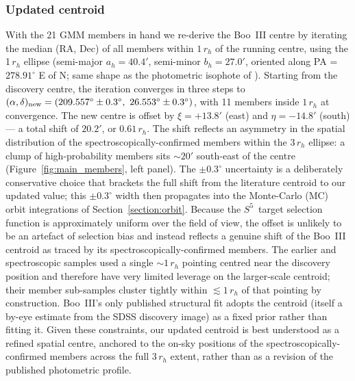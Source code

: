 \documentclass[twocolumn, apj, numberedappendix, appendixfloats]{openjournal_dhayaa}
\newcommand{\SSSSS}{${S}^5$\xspace}
\begin{document}
\subsubsection{Updated centroid}
With the 21 GMM members in hand we re-derive the Boo~III centre by iterating the median (RA, Dec) of all members within $1\,r_h$ of the running centre, using the 1\,$r_h$ ellipse (semi-major $a_h = 40.4'$, semi-minor $b_h = 27.0'$, oriented along PA = $278.91^\circ$ E of N; same shape as the photometric isophote of \citealt{Moskowitz2020}). Starting from the \citet{Grillmair2009} discovery centre, the iteration converges in three steps to $(\alpha, \delta)_{\rm new} = (209.557^\circ \pm 0.3^\circ,\ 26.553^\circ \pm 0.3^\circ)$, with 11 members inside $1\,r_h$ at convergence. The new centre is offset by $\xi = +13.8'$ (east) and $\eta = -14.8'$ (south) --- a total shift of $20.2'$, or $0.61\,r_h$. The shift reflects an asymmetry in the spatial distribution of the spectroscopically-confirmed members within the $3\,r_h$ ellipse: a clump of high-probability members sits $\sim 20'$ south-east of the \citet{Grillmair2009} centre (Figure~\ref{fig:main_members}, left panel). The $\pm 0.3^\circ$ uncertainty is a deliberately conservative choice that brackets the full shift from the literature \citet{Grillmair2009} centroid to our updated value; this $\pm 0.3^\circ$ width then propagates into the Monte-Carlo (MC) orbit integrations of Section~\ref{section:orbit}. Because the \SSSSS\ target selection function is approximately uniform over the field of view, the offset is unlikely to be an artefact of selection bias and instead reflects a genuine shift of the Boo~III centroid as traced by its spectroscopically-confirmed members.  The earlier \citet{Carlin2018} and \citet{Geha2026} spectroscopic samples used a single $\sim 1\,r_h$ pointing centred near the \citet{Grillmair2009} discovery position and therefore have very limited leverage on the larger-scale centroid; their member sub-samples cluster tightly within $\lesssim 1\,r_h$ of that pointing by construction.  Boo~III's only published structural fit \citep{Moskowitz2020} adopts the \citet{Grillmair2009} centroid (itself a by-eye estimate from the SDSS discovery image) as a fixed prior rather than fitting it.  Given these constraints, our updated centroid is best understood as a refined spatial centre, anchored to the on-sky positions of the spectroscopically-confirmed members across the full $3\,r_h$ extent, rather than as a revision of the published photometric profile.
\end{document}
